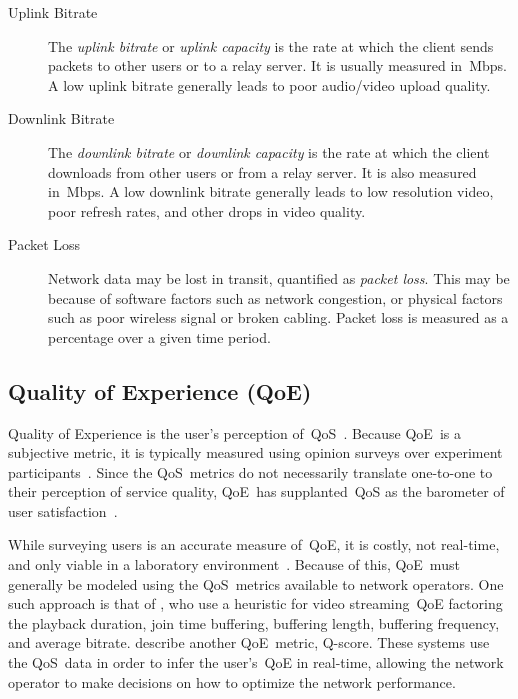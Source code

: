             \begin{description}
                \item[Uplink Bitrate] The \emph{uplink bitrate} or \emph{uplink capacity} is the rate at which the client sends packets to other users or to a relay server. It is usually measured in~Mbps. A low uplink bitrate generally leads to poor audio/video upload quality.

                \item[Downlink Bitrate] The \emph{downlink bitrate} or \emph{downlink capacity} is the rate at which the client downloads from other users or from a relay server. It is also measured in~Mbps. A low downlink bitrate generally leads to low resolution video, poor refresh rates, and other drops in video quality.

                \item[Packet Loss] Network data may be lost in transit, quantified as \emph{packet loss}. This may be because of software factors such as network congestion, or physical factors such as poor wireless signal or broken cabling. Packet loss is measured as a percentage over a given time period.
            \end{description}
        


    \subsection{Quality of Experience (QoE)}\label{introduction:qoe}
        Quality of Experience is the user's perception of~QoS~\autocite{ChenYanjiao2015FQtQ}. Because QoE~is a subjective metric, it is typically measured using opinion surveys over experiment participants~\autocite{ChenYanjiao2015FQtQ,RodrriguezDemóstenesZ2014Vqai}. Since the QoS~metrics do not necessarily translate one-to-one to their perception of service quality, QoE~has supplanted~QoS as the barometer of user satisfaction~\autocite{DinakiHosseinEbrahimi2021FVQW}.

        While surveying users is an accurate measure of~QoE, it is costly, not real-time, and only viable in a laboratory environment~\autocite{ChenYanjiao2015FQtQ,SongHan2011Qpsq}. Because of this, QoE~must generally be modeled using the QoS~metrics available to network operators. One such approach is that of \textcite{DinakiHosseinEbrahimi2021FVQW}, who use a heuristic for video streaming~QoE factoring the playback duration, join time buffering, buffering length, buffering frequency, and average bitrate. \Textcite{SongHan2011Qpsq} describe another QoE~metric, Q-score. These systems use the QoS~data in order to infer the user's~QoE in real-time, allowing the network operator to make decisions on how to optimize the network performance.

